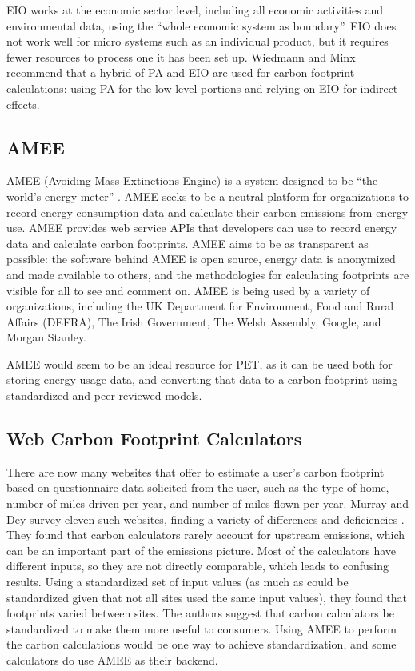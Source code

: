 EIO works at the economic sector level, including all economic activities and environmental data, using the ``whole economic system as boundary''. EIO does not work well for micro systems such as an individual product, but it requires fewer resources to process one it has been set up. Wiedmann and Minx recommend that a hybrid of PA and EIO are used for carbon footprint calculations: using PA for the low-level portions and relying on EIO for indirect effects.

\subsection{AMEE}
\label{amee}

AMEE (Avoiding Mass Extinctions Engine) is a system designed to be ``the world's energy meter'' \cite{AMEE-website}. AMEE seeks to be a neutral platform for organizations to record energy consumption data and calculate their carbon emissions from energy use. AMEE provides web service APIs that developers can use to record energy data and calculate carbon footprints. AMEE aims to be as transparent as possible: the software behind AMEE is open source, energy data is anonymized and made available to others, and the methodologies for calculating footprints are visible for all to see and comment on. AMEE is being used by a variety of organizations, including the UK Department for Environment, Food and Rural Affairs (DEFRA), The Irish Government, The Welsh Assembly, Google, and Morgan Stanley.

AMEE would seem to be an ideal resource for PET, as it can be used both for storing energy usage data, and converting that data to a carbon footprint using standardized and peer-reviewed models.

\subsection{Web Carbon Footprint Calculators}
\label{carbon-calculators}

There are now many websites that offer to estimate a user's carbon footprint based on questionnaire data solicited from the user, such as the type of home, number of miles driven per year, and number of miles flown per year. Murray and Dey survey eleven such websites, finding a variety of differences and deficiencies \cite{Murray2007Carbon-neutral}. They found that carbon calculators rarely account for upstream emissions, which can be an important part of the emissions picture. Most of the calculators have different inputs, so they are not directly comparable, which leads to confusing results. Using a standardized set of input values (as much as could be standardized given that not all sites used the same input values), they found that footprints varied between sites. The authors suggest that carbon calculators be standardized to make them more useful to consumers. Using AMEE to perform the carbon calculations would be one way to achieve standardization, and some calculators do use AMEE as their backend.

